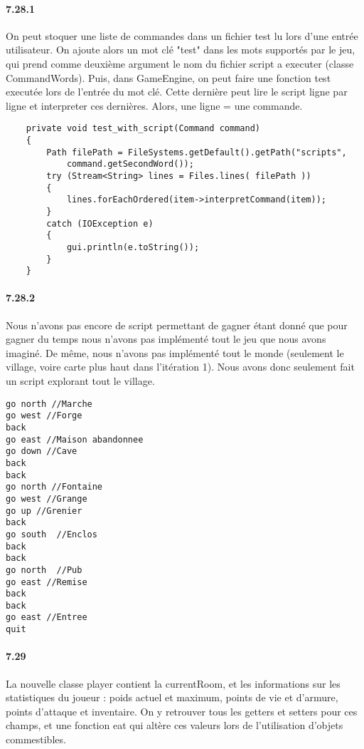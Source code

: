 \documentclass[11pt,a4paper]{report}
\begin{document}
\paragraph{7.28.1}
On peut stoquer une liste de commandes dans un fichier test lu lors d'une entrée utilisateur. On ajoute alors un mot clé "test" dans les mots supportés par le jeu, qui prend comme deuxième argument le nom du fichier script a executer (classe CommandWords). Puis, dans GameEngine, on peut faire une fonction test executée lors de l'entrée du mot clé. Cette dernière peut lire le script ligne par ligne et interpreter ces dernières. Alors, une ligne = une commande.
\begin{lstlisting}
    private void test_with_script(Command command)
    {
        Path filePath = FileSystems.getDefault().getPath("scripts", 
        	command.getSecondWord());
        try (Stream<String> lines = Files.lines( filePath ))
        {
        	lines.forEachOrdered(item->interpretCommand(item));
        }
        catch (IOException e)
        {
        	gui.println(e.toString());
        }
    }
\end{lstlisting}
\paragraph{7.28.2}
Nous n'avons pas encore de script permettant de gagner étant donné que pour gagner du temps nous n'avons pas implémenté tout le jeu que nous avons imaginé. De même, nous n'avons pas implémenté tout le monde (seulement le village, voire carte plus haut dans l'itération 1). Nous avons donc seulement fait un script explorant tout le village.
\begin{lstlisting}
go north //Marche
go west //Forge
back
go east //Maison abandonnee
go down //Cave
back
back
go north //Fontaine
go west //Grange
go up //Grenier
back
go south  //Enclos
back
back
go north  //Pub
go east //Remise
back
back
go east //Entree
quit
\end{lstlisting}

\paragraph{7.29}
La nouvelle classe player contient la currentRoom, et les informations sur les statistiques du joueur : poids actuel et maximum, points de vie et d'armure, points d'attaque et inventaire. On y retrouver tous les getters et setters pour ces champs, et une fonction eat qui altère ces valeurs lors de l'utilisation d'objets commestibles.
\end{document}
